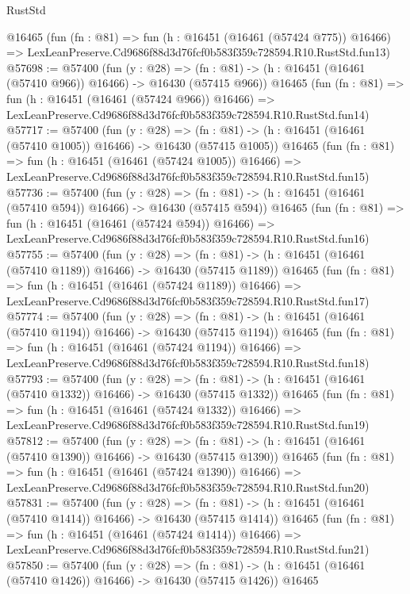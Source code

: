 \begin{lexlean}{RustStd}
\begin{coremodule}
    @16465
    (fun (fn : @81) =>
    fun (h : @16451 (@16461 (@57424 @775)) @16466) =>
    LexLeanPreserve.Cd9686f88d3d76fcf0b583f359c728594.R10.RustStd.fun13)
@57698 := @57400
    (fun (y : @28) =>
    (fn : @81) -> (h : @16451 (@16461 (@57410 @966)) @16466) -> @16430 (@57415 @966))
    @16465
    (fun (fn : @81) =>
    fun (h : @16451 (@16461 (@57424 @966)) @16466) =>
    LexLeanPreserve.Cd9686f88d3d76fcf0b583f359c728594.R10.RustStd.fun14)
@57717 := @57400
    (fun (y : @28) =>
    (fn : @81) -> (h : @16451 (@16461 (@57410 @1005)) @16466) -> @16430 (@57415 @1005))
    @16465
    (fun (fn : @81) =>
    fun (h : @16451 (@16461 (@57424 @1005)) @16466) =>
    LexLeanPreserve.Cd9686f88d3d76fcf0b583f359c728594.R10.RustStd.fun15)
@57736 := @57400
    (fun (y : @28) =>
    (fn : @81) -> (h : @16451 (@16461 (@57410 @594)) @16466) -> @16430 (@57415 @594))
    @16465
    (fun (fn : @81) =>
    fun (h : @16451 (@16461 (@57424 @594)) @16466) =>
    LexLeanPreserve.Cd9686f88d3d76fcf0b583f359c728594.R10.RustStd.fun16)
@57755 := @57400
    (fun (y : @28) =>
    (fn : @81) -> (h : @16451 (@16461 (@57410 @1189)) @16466) -> @16430 (@57415 @1189))
    @16465
    (fun (fn : @81) =>
    fun (h : @16451 (@16461 (@57424 @1189)) @16466) =>
    LexLeanPreserve.Cd9686f88d3d76fcf0b583f359c728594.R10.RustStd.fun17)
@57774 := @57400
    (fun (y : @28) =>
    (fn : @81) -> (h : @16451 (@16461 (@57410 @1194)) @16466) -> @16430 (@57415 @1194))
    @16465
    (fun (fn : @81) =>
    fun (h : @16451 (@16461 (@57424 @1194)) @16466) =>
    LexLeanPreserve.Cd9686f88d3d76fcf0b583f359c728594.R10.RustStd.fun18)
@57793 := @57400
    (fun (y : @28) =>
    (fn : @81) -> (h : @16451 (@16461 (@57410 @1332)) @16466) -> @16430 (@57415 @1332))
    @16465
    (fun (fn : @81) =>
    fun (h : @16451 (@16461 (@57424 @1332)) @16466) =>
    LexLeanPreserve.Cd9686f88d3d76fcf0b583f359c728594.R10.RustStd.fun19)
@57812 := @57400
    (fun (y : @28) =>
    (fn : @81) -> (h : @16451 (@16461 (@57410 @1390)) @16466) -> @16430 (@57415 @1390))
    @16465
    (fun (fn : @81) =>
    fun (h : @16451 (@16461 (@57424 @1390)) @16466) =>
    LexLeanPreserve.Cd9686f88d3d76fcf0b583f359c728594.R10.RustStd.fun20)
@57831 := @57400
    (fun (y : @28) =>
    (fn : @81) -> (h : @16451 (@16461 (@57410 @1414)) @16466) -> @16430 (@57415 @1414))
    @16465
    (fun (fn : @81) =>
    fun (h : @16451 (@16461 (@57424 @1414)) @16466) =>
    LexLeanPreserve.Cd9686f88d3d76fcf0b583f359c728594.R10.RustStd.fun21)
@57850 := @57400
    (fun (y : @28) =>
    (fn : @81) -> (h : @16451 (@16461 (@57410 @1426)) @16466) -> @16430 (@57415 @1426))
    @16465

\end{coremodule}
\end{lexlean}
